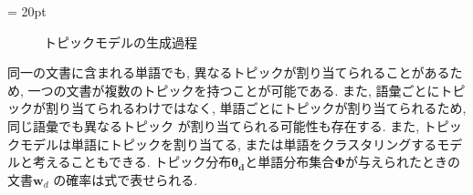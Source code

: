 \documentclass{ltjarticle}
\begin{document}
\newpage
\fboxsep = 20pt
\begin{figure}[h]
    \centering
    \caption{トピックモデルの生成過程}
    \label{fig:生成過程}
\end{figure}
\vspace{10truept}

同一の文書に含まれる単語でも, 異なるトピックが割り当てられることがあるため, 一つの文書が複数のトピックを持つことが可能である. 
また, 語彙ごとにトピックが割り当てられるわけではなく, 単語ごとにトピックが割り当てられるため, 同じ語彙でも異なるトピック
が割り当てられる可能性も存在する. 
また, トピックモデルは単語にトピックを割り当てる, または単語をクラスタリングするモデルと考えることもできる. 
トピック分布$\boldsymbol{\theta_d}$と単語分布集合$\boldsymbol{\Phi}$が与えられたときの文書$\boldsymbol{w}_d$
の確率は式で表せられる.
\vspace{10truept}
\end{document}
